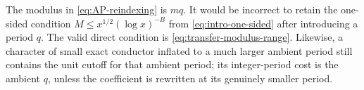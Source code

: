\begin{remark}
\label{rem:combined-modulus-boundary}
The modulus in \eqref{eq:AP-reindexing} is $mq$.  It would be incorrect to
retain the one-sided condition $M\leq x^{1/2}(\log x)^{-B}$ from
\eqref{eq:intro-one-sided} after introducing a period $q$.  The valid direct
condition is \eqref{eq:transfer-modulus-range}.  Likewise, a character of
small exact conductor inflated to a much larger ambient period still
contains the unit cutoff for that ambient period; its integer-period cost is
the ambient $q$, unless the coefficient is rewritten at its genuinely
smaller period.
\end{remark}
